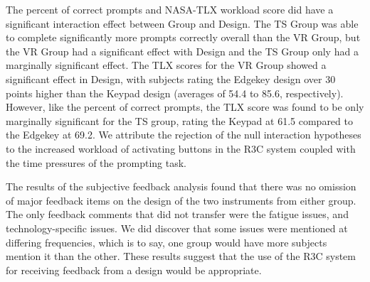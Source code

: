 The percent of correct prompts and NASA-TLX workload score did have a significant interaction effect between Group and Design.
The TS Group was able to complete significantly more prompts correctly overall than the VR Group, but the VR Group had a significant effect with Design and the TS Group only had a marginally significant effect.
The TLX scores for the VR Group showed a significant effect in Design, with subjects rating the Edgekey design over 30 points higher than the Keypad design (averages of 54.4 to 85.6, respectively).
However, like the percent of correct prompts, the TLX score was found to be only marginally significant for the TS group, rating the Keypad at 61.5 compared to the Edgekey at 69.2.
We attribute the rejection of the null interaction hypotheses to the increased workload of activating buttons in the R3C system coupled with the time pressures of the prompting task.

The results of the subjective feedback analysis found that there was no omission of major feedback items on the design of the two instruments from either group.
The only feedback comments that did not transfer were the fatigue issues, and technology-specific issues.
We did discover that some issues were mentioned at differing frequencies, which is to say, one group would have more subjects mention it than the other.
These results suggest that the use of the R3C system for receiving feedback from a design would be appropriate.

%
%
